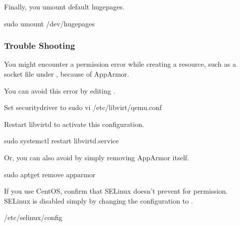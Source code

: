 \documentclass[a4paper,11pt,openany,oneside,english]{sphinxmanual}
\begin{document}
Finally, you umount default hugepages.

\begin{sphinxVerbatim}[commandchars=\\\{\},formatcom=\footnotesize]
 sudo umount /dev/hugepages
\end{sphinxVerbatim}


\subsubsection{Trouble Shooting}
\label{\detokenize{gsg/setup:trouble-shooting}}
You might encounter a permission error while creating a resource,
such as a socket file under , because of AppArmor.

You can avoid this error by editing .

\begin{sphinxVerbatim}[commandchars=\\\{\},formatcom=\footnotesize]
 Set security\PYGZus{}driver to 
sudo vi /etc/libvirt/qemu.conf
\end{sphinxVerbatim}

Restart libvirtd to activate this configuration.

\begin{sphinxVerbatim}[commandchars=\\\{\},formatcom=\footnotesize]
sudo systemctl restart libvirtd.service
\end{sphinxVerbatim}

Or, you can also avoid by simply removing AppArmor itself.

\begin{sphinxVerbatim}[commandchars=\\\{\},formatcom=\footnotesize]
 sudo apt\PYGZhy{}get remove apparmor
\end{sphinxVerbatim}

If you use CentOS, confirm that SELinux doesn’t prevent
for permission.
SELinux is disabled simply by changing the configuration to .

\begin{sphinxVerbatim}[commandchars=\\\{\},formatcom=\footnotesize]
 /etc/selinux/config
\end{sphinxVerbatim}
\end{document}
